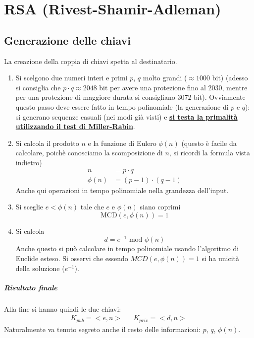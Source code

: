 \chapter{RSA (Rivest-Shamir-Adleman)}
\section{Generazione delle chiavi}
La creazione della coppia di chiavi spetta al destinatario.
\begin{enumerate}
    \item Si scelgono due numeri interi e primi $p$, $q$ molto grandi ($\approx 1000$ bit) (adesso si consiglia che $p \cdot q \approx 2048$ bit per avere una protezione fino al 2030, mentre per una protezione di maggiore durata si consigliano 3072 bit). Ovviamente questo passo deve essere fatto in tempo polinomiale (la generazione di $p$ e $q$): si generano sequenze casuali (nei modi già visti) e \textbf{\underline{si testa la primalità utilizzando il test di Miller-Rabin}}.
    \item Si calcola il prodotto $n$ e la funzione di Eulero $\phi(n)$ (questo è facile da calcolare, poichè conosciamo la scomposizione di $n$, si ricordi la formula vista indietro)
    \begin{align*}
    	n&=p\cdot q\\
    	\phi(n)&=(p-1) \cdot (q-1)
   \end{align*}Anche qui operazioni in tempo polinomiale nella grandezza dell'input.
    \item Si sceglie $e < \phi(n)$ tale che $e$ e $\phi(n)$ siano coprimi
    $$\text{MCD}(e, \phi(n))=1$$
    \item Si calcola $$d = e^{-1} \text{ mod } \phi(n)$$ Anche questo si può calcolare in tempo polinomiale usando l'algoritmo di Euclide esteso. Si osservi che essendo $MCD(e, \phi(n))=1$ si ha unicità della soluzione ($e^{-1}$).
\end{enumerate}

\paragraph{Risultato finale} Alla fine si hanno quindi le due chiavi:
\begin{align*}
K_{pub} = <e,n> && K_{priv} = <d,n>
\end{align*}
Naturalmente va tenuto segreto anche il resto delle informazioni: $p$, $q$, $\phi(n)$.

